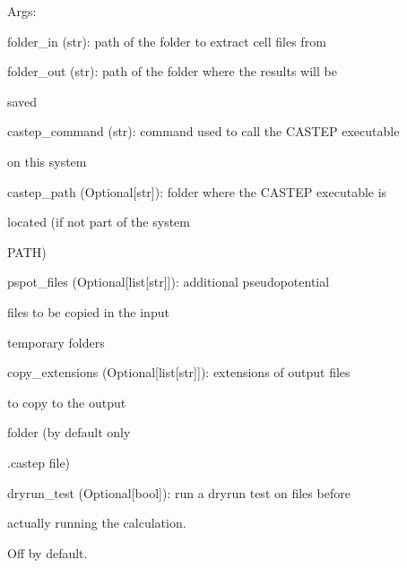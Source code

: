 \documentclass[letterpaper,10pt,english]{sphinxmanual}
\begin{document}
\begin{fulllineitems}
\begin{fulllineitems}
\begin{DUlineblock}{0em}
\item[] Args:
\item[]
\begin{DUlineblock}{\DUlineblockindent}
\item[] folder\_in (str): path of the folder to extract cell files from
\item[] folder\_out (str): path of the folder where the results will be
\item[]
\begin{DUlineblock}{\DUlineblockindent}
\item[] saved
\end{DUlineblock}
\item[] castep\_command (str): command used to call the CASTEP executable
\item[]
\begin{DUlineblock}{\DUlineblockindent}
\item[] on this system
\end{DUlineblock}
\item[] castep\_path (Optional{[}str{]}): folder where the CASTEP executable is
\item[]
\begin{DUlineblock}{\DUlineblockindent}
\item[] located (if not part of the system
\item[] PATH)
\end{DUlineblock}
\item[] pspot\_files (Optional{[}list{[}str{]}{]}): additional pseudopotential
\item[]
\begin{DUlineblock}{\DUlineblockindent}
\item[] files to be copied in the input
\item[] temporary folders
\end{DUlineblock}
\item[] copy\_extensions (Optional{[}list{[}str{]}{]}): extensions of output files
\item[]
\begin{DUlineblock}{\DUlineblockindent}
\item[] to copy to the output
\item[] folder (by default only
\item[] .castep file)
\end{DUlineblock}
\item[] dryrun\_test (Optional{[}bool{]}): run a dryrun test on files before
\item[]
\begin{DUlineblock}{\DUlineblockindent}
\item[] actually running the calculation.
\item[] Off by default.
\end{DUlineblock}
\end{DUlineblock}
\end{DUlineblock}


\end{fulllineitems}
\end{fulllineitems}
\end{document}
